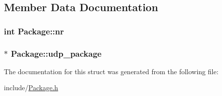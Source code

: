 \subsection{Member Data Documentation}
\hypertarget{structPackage_a562eb146b1c09eb1a819e2b36a64ecc3}{
\subsubsection[{nr}]{\setlength{\rightskip}{0pt plus 5cm}int Package\-::nr}}\label{structPackage_a562eb146b1c09eb1a819e2b36a64ecc3}
\hypertarget{structPackage_af73983d5bf7c911c68c9f74639d5f860}{
\subsubsection[{udp\-\_\-package}]{$\ast$ Package\-::udp\-\_\-package}}\label{structPackage_af73983d5bf7c911c68c9f74639d5f860}


The documentation for this struct was generated from the following file\-:\begin{DoxyCompactItemize}
\item 
include/\hyperlink{Package_8h}{Package.\-h}\end{DoxyCompactItemize}
